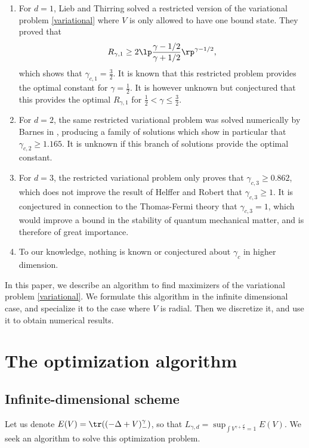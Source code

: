 \documentclass[10pt,a4paper,reqno]{amsart}
\begin{document}
\begin{enumerate}
\item For $d = 1$, Lieb and Thirring solved a restricted version of
  the variational problem \eqref{variational} where $V$ is only
  allowed to have one bound state\cite{lieb1976bound}. They
  proved that
  \begin{align*}
    R_{\gamma,1} \geq 2 \lp \frac{\gamma-1/2}{\gamma+1/2}\rp^{\gamma-1/2},
  \end{align*}
  which shows that $\gamma_{c,1} = \frac 3 2$. It is known that this
  restricted problem provides the optimal constant for $\gamma = \frac
  1 2$. It is however unknown but conjectured that this provides the
  optimal $R_{\gamma,1}$ for $\frac 1 2 < \gamma \leq \frac 3 2 $.
\item For $d = 2$, the same restricted variational problem was solved
  numerically by Barnes in \cite{lieb1976bound}, producing a family of
  solutions which show in particular that $\gamma_{c,2} \geq
  1.165$. It is unknown if this branch of solutions provide the
  optimal constant.
\item For $d = 3$, the restricted variational problem only proves that
  $\gamma_{c,3} \geq 0.862$, which does not improve the result of
  Helffer and Robert that $\gamma_{c,3} \geq 1$. It is conjectured
  in connection to the Thomas-Fermi theory that $\gamma_{c,3} = 1$,
  which would improve a bound in the stability of quantum mechanical
  matter, and is therefore of great importance.
\item To our knowledge, nothing is known or conjectured about
  $\gamma_{c}$ in higher dimension.
\end{enumerate}

In this paper, we describe an algorithm to find maximizers of the
variational problem \eqref{variational}. We formulate this algorithm
in the infinite dimensional case, and specialize it to the case where
$V$ is radial. Then we discretize it, and use it to obtain numerical
results.
\section{The optimization algorithm}
\subsection{Infinite-dimensional scheme}
Let us denote $E(V) = \tr((-\Delta + V)_{-}^{\gamma})$, so that
$L_{\gamma,d} = \sup_{\int V^{\gamma+\frac d 2} = 1} E(V)$. We seek an
algorithm to solve this optimization problem.
\end{document}
